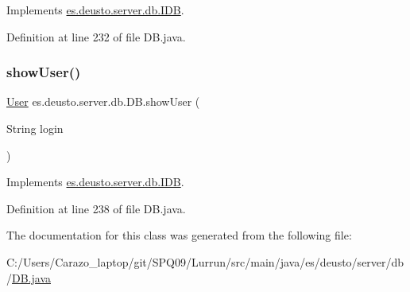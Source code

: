 Implements \hyperlink{interfacees_1_1deusto_1_1server_1_1db_1_1_i_d_b_ad408b5a93077c152ceba270caa34fd0a}{es.\+deusto.\+server.\+db.\+I\+DB}.



Definition at line 232 of file D\+B.\+java.

\mbox{\label{classes_1_1deusto_1_1server_1_1db_1_1_d_b_ac85523faea523033439a932bbcab2c7e}} 
\subsubsection{\texorpdfstring{show\+User()}{showUser()}}
{\footnotesize\ttfamily \hyperlink{classes_1_1deusto_1_1server_1_1db_1_1data_1_1_user}{User} es.\+deusto.\+server.\+db.\+D\+B.\+show\+User (\begin{DoxyParamCaption}\item[{String}]{login }\end{DoxyParamCaption})}



Implements \hyperlink{interfacees_1_1deusto_1_1server_1_1db_1_1_i_d_b_aa2f6a5291fa8aa78d5a73b5878d17986}{es.\+deusto.\+server.\+db.\+I\+DB}.



Definition at line 238 of file D\+B.\+java.



The documentation for this class was generated from the following file\+:\begin{DoxyCompactItemize}
\item 
C\+:/\+Users/\+Carazo\+\_\+laptop/git/\+S\+P\+Q09/\+Lurrun/src/main/java/es/deusto/server/db/\hyperlink{_d_b_8java}{D\+B.\+java}\end{DoxyCompactItemize}
